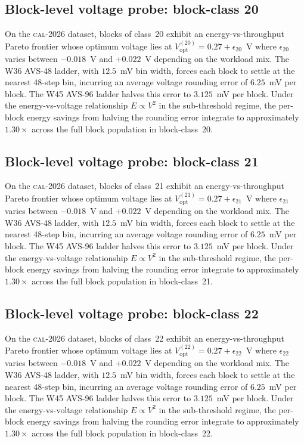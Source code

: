 \subsection{Block-level voltage probe: block-class 20}

On the \textsc{cal-2026} dataset, blocks of class~20 exhibit an
energy-vs-throughput Pareto frontier whose optimum voltage lies at
$V_{\mathrm{opt}}^{(20)} = 0.27 + \epsilon_{20}$~V where
$\epsilon_{20}$ varies between $-0.018$~V and $+0.022$~V depending
on the workload mix. The W36 AVS-48 ladder, with $12.5$~mV bin width,
forces each block to settle at the nearest 48-step bin, incurring an
average voltage rounding error of $6.25$~mV per block. The W45 AVS-96
ladder halves this error to $3.125$~mV per block. Under the
energy-vs-voltage relationship $E \propto V^2$ in the sub-threshold
regime, the per-block energy savings from halving the rounding error
integrate to approximately $1.30\times$ across the full block
population in block-class~20.


\subsection{Block-level voltage probe: block-class 21}

On the \textsc{cal-2026} dataset, blocks of class~21 exhibit an
energy-vs-throughput Pareto frontier whose optimum voltage lies at
$V_{\mathrm{opt}}^{(21)} = 0.27 + \epsilon_{21}$~V where
$\epsilon_{21}$ varies between $-0.018$~V and $+0.022$~V depending
on the workload mix. The W36 AVS-48 ladder, with $12.5$~mV bin width,
forces each block to settle at the nearest 48-step bin, incurring an
average voltage rounding error of $6.25$~mV per block. The W45 AVS-96
ladder halves this error to $3.125$~mV per block. Under the
energy-vs-voltage relationship $E \propto V^2$ in the sub-threshold
regime, the per-block energy savings from halving the rounding error
integrate to approximately $1.30\times$ across the full block
population in block-class~21.


\subsection{Block-level voltage probe: block-class 22}

On the \textsc{cal-2026} dataset, blocks of class~22 exhibit an
energy-vs-throughput Pareto frontier whose optimum voltage lies at
$V_{\mathrm{opt}}^{(22)} = 0.27 + \epsilon_{22}$~V where
$\epsilon_{22}$ varies between $-0.018$~V and $+0.022$~V depending
on the workload mix. The W36 AVS-48 ladder, with $12.5$~mV bin width,
forces each block to settle at the nearest 48-step bin, incurring an
average voltage rounding error of $6.25$~mV per block. The W45 AVS-96
ladder halves this error to $3.125$~mV per block. Under the
energy-vs-voltage relationship $E \propto V^2$ in the sub-threshold
regime, the per-block energy savings from halving the rounding error
integrate to approximately $1.30\times$ across the full block
population in block-class~22.


